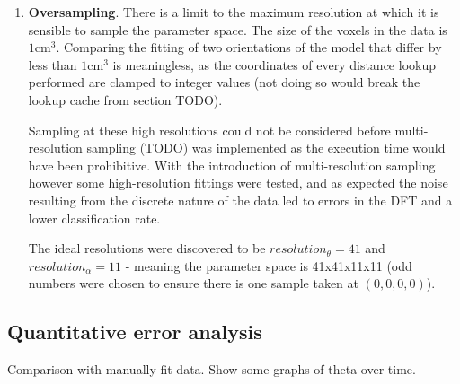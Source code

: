 \begin{enumerate}
	\item \textbf{Oversampling}.
		There is a limit to the maximum resolution at which it is sensible to sample the parameter space.
		The size of the voxels in the data is $1\text{cm}^3$.
		Comparing the fitting of two orientations of the model that differ by less than $1\text{cm}^3$ is meaningless,
		as the coordinates of every distance lookup performed are clamped to integer values (not doing so would break
		the lookup cache from section TODO).
		
		Sampling at these high resolutions could not be considered before multi-resolution sampling (TODO) was implemented
		as the execution time would have been prohibitive.
		With the introduction of multi-resolution sampling however some high-resolution fittings were tested, and as expected
		the noise resulting from the discrete nature of the data led to errors in the DFT and a lower classification rate.
		
		The ideal resolutions were discovered to be $resolution_\theta = 41$ and $resolution_\alpha = 11$ - meaning the
		parameter space is 41x41x11x11 (odd numbers were chosen to ensure there is one sample taken at $(0, 0, 0, 0)$).
\end{enumerate}


\subsection{Quantitative error analysis}

Comparison with manually fit data.
Show some graphs of theta over time.